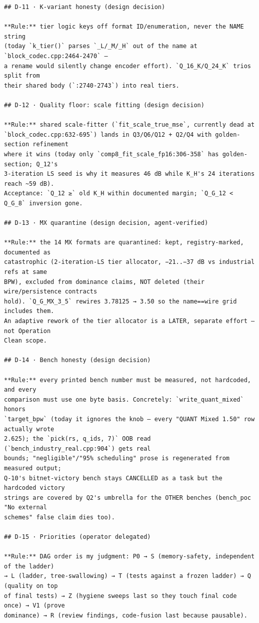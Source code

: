 \begin{verbatim}
## D-11 · K-variant honesty (design decision)

**Rule:** tier logic keys off format ID/enumeration, never the NAME string
(today `k_tier()` parses `_L/_M/_H` out of the name at `block_codec.cpp:2464-2470` —
a rename would silently change encoder effort). `Q_16_K/Q_24_K` trios split from
their shared body (`:2740-2743`) into real tiers.

## D-12 · Quality floor: scale fitting (design decision)

**Rule:** shared scale-fitter (`fit_scale_true_mse`, currently dead at
`block_codec.cpp:632-695`) lands in Q3/Q6/Q12 + Q2/Q4 with golden-section refinement
where it wins (today only `comp8_fit_scale_fp16:306-358` has golden-section; Q_12's
3-iteration LS seed is why it measures 46 dB while K_H's 24 iterations reach ~59 dB).
Acceptance: `Q_12 ≥` old K_H within documented margin; `Q_G_12 < Q_G_8` inversion gone.

## D-13 · MX quarantine (design decision, agent-verified)

**Rule:** the 14 MX formats are quarantined: kept, registry-marked, documented as
catastrophic (2-iteration-LS tier allocator, −21..−37 dB vs industrial refs at same
BPW), excluded from dominance claims, NOT deleted (their wire/persistence contracts
hold). `Q_G_MX_3_5` rewires 3.78125 → 3.50 so the name==wire grid includes them.
An adaptive rework of the tier allocator is a LATER, separate effort — not Operation
Clean scope.

## D-14 · Bench honesty (design decision)

**Rule:** every printed bench number must be measured, not hardcoded, and every
comparison must use one byte basis. Concretely: `write_quant_mixed` honors
`target_bpw` (today it ignores the knob — every "QUANT Mixed 1.50" row actually wrote
2.625); the `pick(rs, q_ids, 7)` OOB read (`bench_industry_real.cpp:904`) gets real
bounds; "negligible"/"95% scheduling" prose is regenerated from measured output;
Q-10's bitnet-victory bench stays CANCELLED as a task but the hardcoded victory
strings are covered by Q2's umbrella for the OTHER benches (bench_poc "No external
schemes" false claim dies too).

## D-15 · Priorities (operator delegated)

**Rule:** DAG order is my judgment: P0 → S (memory-safety, independent of the ladder)
→ L (ladder, tree-swallowing) → T (tests against a frozen ladder) → Q (quality on top
of final tests) → Z (hygiene sweeps last so they touch final code once) → V1 (prove
dominance) → R (review findings, code-fusion last because pausable).


\end{verbatim}
